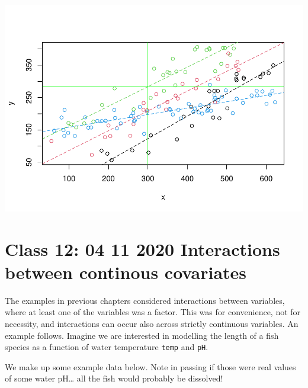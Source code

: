 \documentclass[
]{book}
\begin{document}
\includegraphics{ECOMODbook_files/figure-latex/a11.27-1.pdf}

\hypertarget{aula13}{%
\chapter{Class 12: 04 11 2020 Interactions between continous covariates}\label{aula13}}

The examples in previous chapters considered interactions between variables, where at least one of the variables was a factor. This was for convenience, not for necessity, and interactions can occur also across strictly continuous variables. An example follows. Imagine we are interested in modelling the length of a fish species as a function of water temperature \texttt{temp} and \texttt{pH}.

We make up some example data below. Note in passing if those were real values of some water pH\ldots{} all the fish would probably be dissolved!
\end{document}
